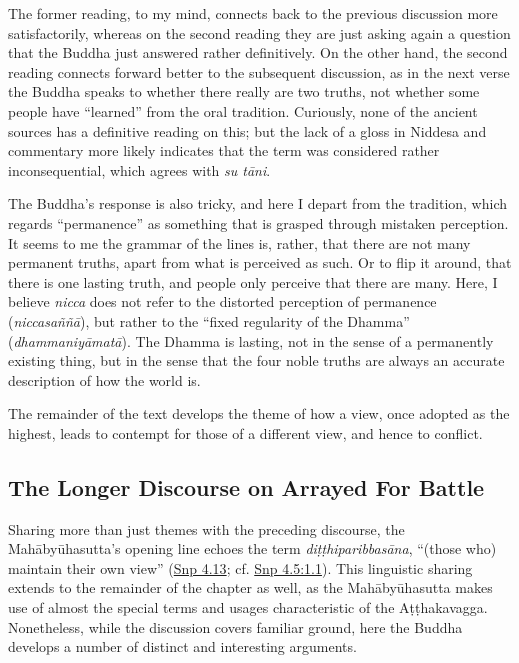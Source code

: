 \documentclass[12pt,openany]{book}%
\begin{document}
The former reading, to my mind, connects back to the previous discussion more satisfactorily, whereas on the second reading they are just asking again a question that the Buddha just answered rather definitively. On the other hand, the second reading connects forward better to the subsequent discussion, as in the next verse the Buddha speaks to whether there really are two truths, not whether some people have “learned” from the oral tradition. Curiously, none of the ancient sources has a definitive reading on this; but the lack of a gloss in Niddesa and commentary more likely indicates that the term was considered rather inconsequential, which agrees with \textit{su \textsanskrit{tāni}}.

The Buddha’s response is also tricky, and here I depart from the tradition, which regards “permanence” as something that is grasped through mistaken perception. It seems to me the grammar of the lines is, rather, that there are not many permanent truths, apart from what is perceived as such. Or to flip it around, that there is one lasting truth, and people only perceive that there are many. Here, I believe \textit{nicca} does not refer to the distorted perception of permanence (\textit{\textsanskrit{niccasaññā}}), but rather to the “fixed regularity of the Dhamma” (\textit{\textsanskrit{dhammaniyāmatā}}). The Dhamma is lasting, not in the sense of a permanently existing thing, but in the sense that the four noble truths are always an accurate description of how the world is.

The remainder of the text develops the theme of how a view, once adopted as the highest, leads to contempt for those of a different view, and hence to conflict.

\subsection*{The Longer Discourse on Arrayed For Battle}

Sharing more than just themes with the preceding discourse, the \textsanskrit{Mahābyūhasutta}’s opening line echoes the term \textit{\textsanskrit{diṭṭhiparibbasāna}}, “(those who) maintain their own view” (\href{https://suttacentral.net/snp4.13/en/sujato}{Snp 4.13}; cf. \href{https://suttacentral.net/snp4.5/en/sujato\#1.1}{Snp 4.5:1.1}). This linguistic sharing extends to the remainder of the chapter as well, as the \textsanskrit{Mahābyūhasutta} makes use of almost the special terms and usages characteristic of the \textsanskrit{Aṭṭhakavagga}. Nonetheless, while the discussion covers familiar ground, here the Buddha develops a number of distinct and interesting arguments.
\end{document}
